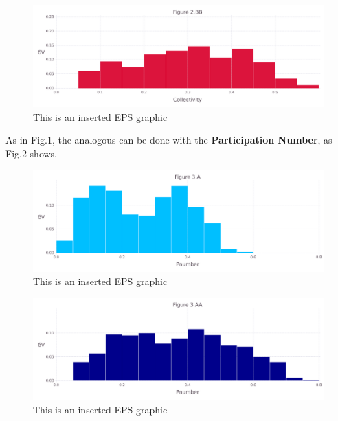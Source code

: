 \documentclass[10pt,letterpaper]{article}
\begin{document}
\begin{figure}[ht]
\begin{center}
\includegraphics[scale=0.5]{1m14/2bbfigure_very_hi-precision.pdf}
\caption{This is an inserted EPS graphic}
\label{fig6}
\end{center}
\end{figure}

\clearpage
As in Fig.1, the analogous can be done with the \textbf{Participation Number}, as Fig.2 shows.

\begin{figure}[ht]
\begin{center}
\includegraphics[scale=0.5]{1m14/3afigure_very_hi-precision.pdf}
\caption{This is an inserted EPS graphic}
\label{fig7}
\end{center}
\end{figure}

\begin{figure}[ht]
\begin{center}
\includegraphics[scale=0.5]{1m14/3aafigure_very_hi-precision.pdf}
\caption{This is an inserted EPS graphic}
\label{fig8}
\end{center}
\end{figure}
\end{document}
